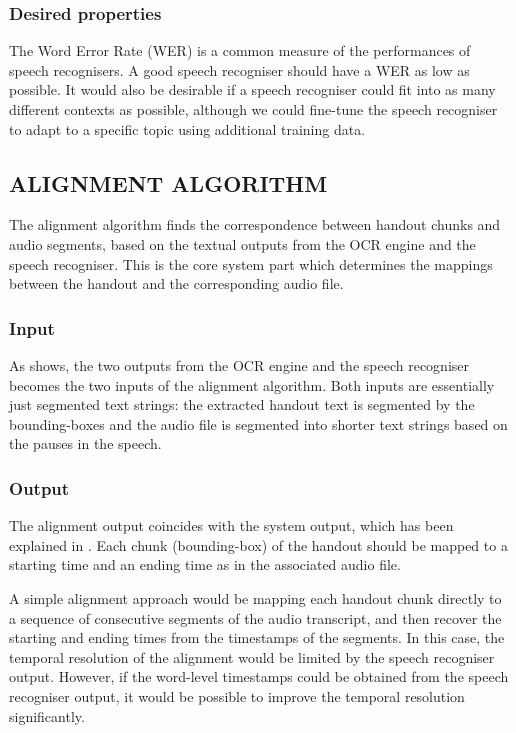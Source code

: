 \documentclass[12pt]{article}
\begin{document}
\subsubsection{Desired properties}

The Word Error Rate (WER) is a common measure of the performances of speech recognisers. A good speech recogniser should have a WER as low as possible. It would also be desirable if a speech recogniser could fit into as many different contexts as possible, although we could fine-tune the speech recogniser to adapt to a specific topic using additional training data.

\subsection{ALIGNMENT ALGORITHM}

The alignment algorithm finds the correspondence between handout chunks and audio segments, based on the textual outputs from the OCR engine and the speech recogniser. This is the core system part which determines the mappings between the handout and the corresponding audio file. 

\subsubsection{Input}

As  shows, the two outputs from the OCR engine and the speech recogniser becomes the two inputs of the alignment algorithm. Both inputs are essentially just segmented text strings: the extracted handout text is segmented by the bounding-boxes and the audio file is segmented into shorter text strings based on the pauses in the speech.

\subsubsection{Output}
\label{sec:sysarch-align-output}

The alignment output coincides with the system output, which has been explained in . Each chunk (bounding-box) of the handout should be mapped to a starting time and an ending time as in the associated audio file. 

A simple alignment approach would be mapping each handout chunk directly to a sequence of consecutive segments of the audio transcript, and then recover the starting and ending times from the timestamps of the segments. In this case, the temporal resolution of the alignment would be limited by the speech recogniser output. However, if the word-level timestamps could be obtained from the speech recogniser output, it would be possible to improve the temporal resolution significantly.
\end{document}
